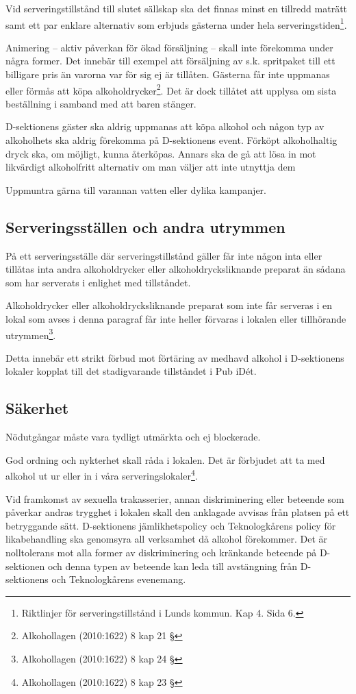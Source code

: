 \documentclass[]{dsekprotokoll}
\begin{document}
Vid serveringstillstånd till slutet sällskap ska det finnas minst en tillredd maträtt samt ett par
enklare alternativ som erbjuds gästerna under hela serveringstiden\footnote{Riktlinjer för serveringstillstånd i Lunds kommun. Kap 4. Sida 6.}.

Animering – aktiv påverkan för ökad försäljning – skall inte förekomma under några former. Det innebär till exempel att försäljning av s.k. spritpaket till ett billigare pris än varorna var för sig ej är tillåten. Gästerna får inte uppmanas eller förmås att köpa alkoholdrycker\footnote{Alkohollagen (2010:1622) 8 kap 21 §}. Det
är dock tillåtet att upplysa om sista beställning i samband med att baren stänger.

D-sektionens gäster ska aldrig uppmanas att köpa alkohol och någon typ av alkoholhets
ska aldrig förekomma på D-sektionens event. Förköpt alkoholhaltig
dryck ska, om möjligt, kunna återköpas. Annars ska de gå
att lösa in mot likvärdigt alkoholfritt alternativ om man väljer att inte utnyttja dem

Uppmuntra gärna till varannan vatten eller dylika kampanjer.

\subsection{Serveringsställen och andra utrymmen}
På ett serveringsställe där serveringstillstånd gäller får inte någon inta eller tillåtas inta andra
alkoholdrycker eller alkoholdrycksliknande preparat än sådana som har serverats i enlighet
med tillståndet.

Alkoholdrycker eller alkoholdrycksliknande preparat som inte får serveras i en lokal som
avses i denna paragraf får inte heller förvaras i lokalen eller tillhörande utrymmen\footnote{Alkohollagen (2010:1622) 8 kap 24 §}.

Detta innebär ett strikt förbud mot förtäring av medhavd alkohol i D-sektionens lokaler
kopplat till det stadigvarande tillståndet i Pub iDét.

\subsection{Säkerhet}
Nödutgångar måste vara tydligt utmärkta och ej blockerade.

God ordning och nykterhet skall råda i lokalen. Det är förbjudet att ta med alkohol ut ur eller in i våra serveringslokaler\footnote{Alkohollagen (2010:1622) 8 kap 23 §}.

Vid framkomst av sexuella trakasserier, annan diskriminering eller beteende som påverkar
andras trygghet i lokalen skall den anklagade avvisas från platsen på ett betryggande sätt.
D-sektionens jämlikhetspolicy och Teknologkårens policy för likabehandling ska genomsyra all verksamhet då alkohol förekommer. Det är nolltolerans mot alla former av diskriminering och kränkande beteende på D-sektionen och denna typen av beteende kan leda till avstängning från
D-sektionens och Teknologkårens evenemang.
\end{document}
